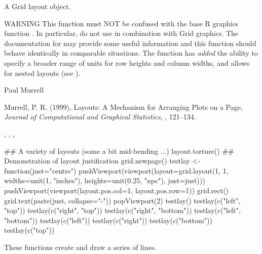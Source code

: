 %
\begin{Value}
A Grid layout object.
\end{Value}
%
\begin{Section}{WARNING}
This function must NOT be confused with the base R graphics function
.  In particular, do not use  in
combination with Grid graphics.  The documentation for
 may provide some useful information and this
function should behave identically in comparable situations.  The
function has \emph{added} the ability to specify a broader range
of units for row heights and column widths, and allows for nested
layouts (see ).
\end{Section}
%
\begin{Author}\relax
Paul Murrell
\end{Author}
%
\begin{References}\relax
Murrell, P. R. (1999), Layouts: A Mechanism for Arranging
Plots on a Page, \emph{Journal of Computational and Graphical
Statistics}, , 121--134.
\end{References}
%
\begin{SeeAlso}\relax
{},
,
,
\end{SeeAlso}
%
\begin{Examples}
\begin{ExampleCode}
## A variety of layouts (some a bit mid-bending ...)
layout.torture()
## Demonstration of layout justification
grid.newpage()
testlay <- function(just="centre") {
  pushViewport(viewport(layout=grid.layout(1, 1, widths=unit(1, "inches"),
                          heights=unit(0.25, "npc"),
                          just=just)))
  pushViewport(viewport(layout.pos.col=1, layout.pos.row=1))
  grid.rect()
  grid.text(paste(just, collapse="-"))
  popViewport(2)
}
testlay()
testlay(c("left", "top"))
testlay(c("right", "top"))
testlay(c("right", "bottom"))
testlay(c("left", "bottom"))
testlay(c("left"))
testlay(c("right"))
testlay(c("bottom"))
testlay(c("top"))
\end{ExampleCode}
\end{Examples}
%
\begin{Description}\relax
These functions create and draw a series of lines.
\end{Description}
